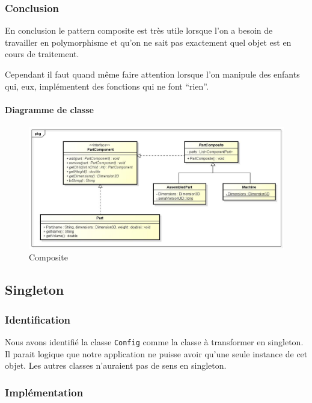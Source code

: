 \documentclass[french,]{article}
\let\oldparagraph\paragraph
\renewcommand{\paragraph}[1]{\oldparagraph{#1}\mbox{}}
\begin{document}
\subsubsection{Conclusion}\label{conclusion}

En conclusion le pattern composite est très utile lorsque l'on a besoin
de travailler en polymorphisme et qu'on ne sait pas exactement quel
objet est en cours de traitement.

Cependant il faut quand même faire attention lorsque l'on manipule des
enfants qui, eux, implémentent des fonctions qui ne font ``rien''.

\paragraph{Diagramme de classe}\label{diagramme-de-classe}

\begin{figure}
\centering
\includegraphics{composite.jpg}
\caption{Composite}
\end{figure}

\subsection{Singleton}\label{singleton}

\subsubsection{Identification}\label{identification-1}

Nous avons identifié la classe \texttt{Config} comme la classe à
transformer en singleton. Il parait logique que notre application ne
puisse avoir qu'une seule instance de cet objet. Les autres classes
n'auraient pas de sens en singleton.

\subsubsection{Implémentation}\label{impluxe9mentation}
\end{document}
